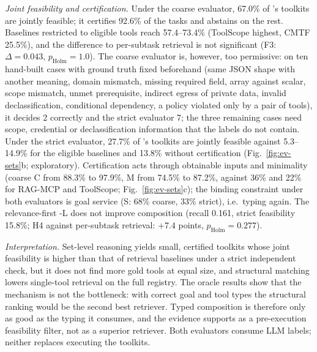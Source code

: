 \emph{Joint feasibility and certification.} Under the coarse evaluator, 67.0\% of \pamcp{}'s toolkits are jointly
feasible; it certifies 92.6\% of the tasks and abstains on the rest. Baselines restricted to eligible tools reach
57.4--73.4\% (ToolScope highest, CMTF 25.5\%), and the difference to per-subtask retrieval is not significant (F3:
$\Delta=0.043$, $p_{\mathrm{Holm}}=1.0$). The coarse evaluator is, however, too permissive: on ten hand-built
cases with ground truth fixed beforehand (same JSON shape with another meaning, domain mismatch, missing required
field, array against scalar, scope mismatch, unmet prerequisite, indirect egress of private data, invalid
declassification, conditional dependency, a policy violated only by a pair of tools), it decides 2 correctly and
the strict evaluator 7; the three remaining cases need scope, credential or declassification information that the
labels do not contain. Under the strict evaluator, 27.7\% of \pamcp{}'s toolkits are jointly feasible against
5.3--14.9\% for the eligible baselines and 13.8\% without certification (Fig.~\ref{fig:ev-sets}b; exploratory).
Certification acts through obtainable inputs and minimality (coarse C from 88.3\% to 97.9\%, M from 74.5\% to
87.2\%, against 36\% and 22\% for RAG-MCP and ToolScope; Fig.~\ref{fig:ev-sets}c); the binding constraint under both
evaluators is goal service (S: 68\% coarse, 33\% strict), i.e.\ typing again. The relevance-first \pamcp{}-L does
not improve composition (recall 0.161, strict feasibility 15.8\%; H4 against per-subtask retrieval: $+7.4$
points, $p_{\mathrm{Holm}}=0.277$).

\emph{Interpretation.} Set-level reasoning yields small, certified toolkits whose joint feasibility is higher than
that of retrieval baselines under a strict independent check, but it does not find more gold tools at equal size,
and structural matching lowers single-tool retrieval on the full registry. The oracle results show that the
mechanism is not the bottleneck: with correct goal and tool types the structural ranking would be the second best
retriever. Typed composition is therefore only as good as the typing it consumes, and the evidence supports
\pamcp{} as a pre-execution feasibility filter, not as a superior retriever. Both evaluators consume LLM labels;
neither replaces executing the toolkits.
